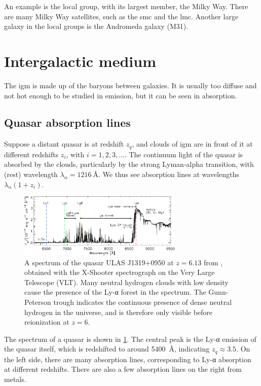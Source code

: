 An example is the local group, with its largest member, the Milky Way.
There are many Milky Way satellites, such as the \ac{smc} and the \ac{lmc}.
Another large galaxy in the local groups is the Andromeda galaxy (M31).






\section{Intergalactic medium}

The \ac{igm} is made up of the baryons between galaxies.
It is usually too diffuse and not hot enough to be studied in emission,
but it can be seen in absorption.

\subsection{Quasar absorption lines}
Suppose a distant quasar is at redshift $z_q$, and clouds of \ac{igm} are in front of it at different redshifts $z_i$, with $i = 1, 2, 3, \dots$.
The continuum light of the quasar is absorbed by the clouds, particularly by the strong Lyman-alpha transition, with (rest) wavelength $\lambda_\mathrm{α} = \SI{1216}{\angstrom}$.
We thus see absorption lines at wavelengths $\lambda_\mathrm{α} (1 + z_i)$.

\begin{figure}
	\includegraphics[width=0.7\textwidth]{img/ch-05/quasar-spectrum.pdf}
	\caption{A spectrum of the quasar ULAS J1319+0950 at $z=6.13$ from \cite{becker2015reionization}, obtained with the X-Shooter spectrograph on the Very Large Telescope (VLT). 
	Many neutral hydrogen clouds with low density cause the presence of the Ly-α forest in the spectrum. 
	The Gunn-Peterson trough indicates the continuous presence of dense neutral hydrogen in the universe, and is therefore only visible before reionization at $z=6$.}
	\label{fig:quasar-spectrum}
\end{figure}

The spectrum of a quasar is shown in \cref{fig:quasar-spectrum}.
The central peak is the Ly-α emission of the quasar itself, which is redshifted to around \SI{5400}{\angstrom}, indicating $z_q \approx 3.5$.
On the left side, there are many absorption lines, corresponding to Ly-α absorption at different redshifts.
There are also a few absorption lines on the right from metals.

